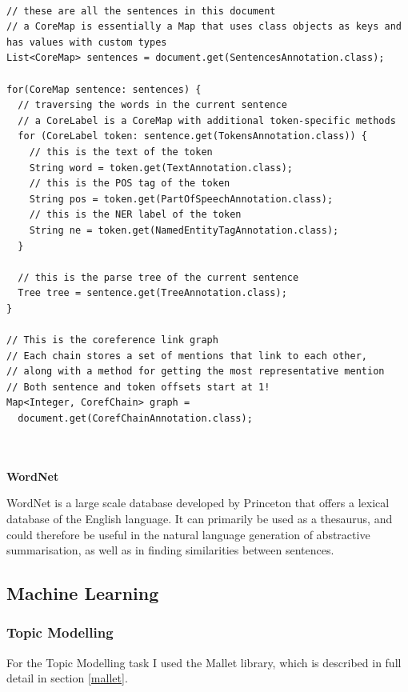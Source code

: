 \documentclass[12pt]{article}
\begin{document}
\begin{lstlisting}[style=MyJava, firstnumber=1, caption={Analysing an annotated document using Stanford's CoreNLP}]

// these are all the sentences in this document
// a CoreMap is essentially a Map that uses class objects as keys and has values with custom types
List<CoreMap> sentences = document.get(SentencesAnnotation.class);

for(CoreMap sentence: sentences) {
  // traversing the words in the current sentence
  // a CoreLabel is a CoreMap with additional token-specific methods
  for (CoreLabel token: sentence.get(TokensAnnotation.class)) {
    // this is the text of the token
    String word = token.get(TextAnnotation.class);
    // this is the POS tag of the token
    String pos = token.get(PartOfSpeechAnnotation.class);
    // this is the NER label of the token
    String ne = token.get(NamedEntityTagAnnotation.class);
  }

  // this is the parse tree of the current sentence
  Tree tree = sentence.get(TreeAnnotation.class);
}

// This is the coreference link graph
// Each chain stores a set of mentions that link to each other,
// along with a method for getting the most representative mention
// Both sentence and token offsets start at 1!
Map<Integer, CorefChain> graph = 
  document.get(CorefChainAnnotation.class); 
 
\end{lstlisting}

\textbf{\\ WordNet}

WordNet is a large scale database developed by Princeton that offers a lexical database of the English language. It can primarily be used as a thesaurus, and could therefore be useful in the natural language generation of abstractive summarisation, as well as in finding similarities between sentences.

\subsection{Machine Learning}

\subsubsection{Topic Modelling}

For the Topic Modelling task I used the Mallet library, which is described in full detail in section \ref{mallet}.
\end{document}
